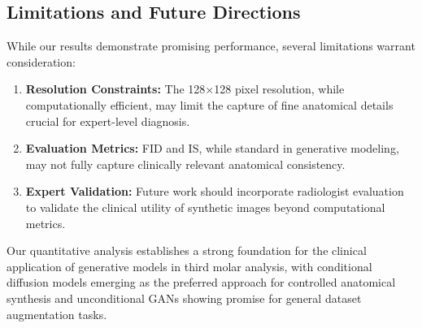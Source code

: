 \subsection{Limitations and Future Directions}

While our results demonstrate promising performance, several limitations warrant consideration:

\begin{enumerate}
    \item \textbf{Resolution Constraints:} The 128×128 pixel resolution, while computationally efficient, may limit the capture of fine anatomical details crucial for expert-level diagnosis.
    \item \textbf{Evaluation Metrics:} FID and IS, while standard in generative modeling, may not fully capture clinically relevant anatomical consistency.
    \item \textbf{Expert Validation:} Future work should incorporate radiologist evaluation to validate the clinical utility of synthetic images beyond computational metrics.
\end{enumerate}

Our quantitative analysis establishes a strong foundation for the clinical application of generative models in third molar analysis, with conditional diffusion models emerging as the preferred approach for controlled anatomical synthesis and unconditional GANs showing promise for general dataset augmentation tasks.